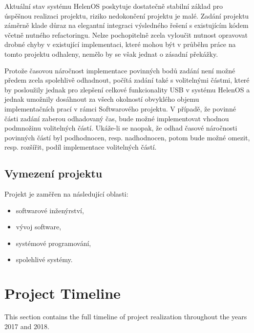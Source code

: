 Aktuální stav systému HelenOS poskytuje dostatečně stabilní základ pro úspěšnou realizaci
projektu, riziko nedokončení projektu je malé. Zadání projektu záměrně klade důraz na elegantní
integraci výsledného řešení s existujícím kódem včetně nutného refactoringu. Nelze pochopitelně
zcela vyloučit nutnost opravovat drobné chyby v existující implementaci, které mohou být
v průběhu práce na tomto projektu odhaleny, nemělo by se však jednat o zásadní překážky.

Protože časovou náročnost implementace povinných bodů zadání není možné předem zcela
spolehlivě odhadnout, počítá zadání také s volitelnými částmi, které by posloužily jednak pro
zlepšení celkové funkcionality USB v systému HelenOS a jednak umožnily dosáhnout za všech
okolností obvyklého objemu implementačních prací v rámci Softwarového projektu. V případě, že
povinné části zadání zaberou odhadovaný čas, bude možné implementovat vhodnou podmnožinu
volitelných částí. Ukáže-li se naopak, že odhad časové náročnosti povinných částí byl
podhodnocen, resp. nadhodnocen, potom bude možné omezit, resp. rozšířit, podíl implementace
volitelných částí.


\subsection{Vymezení projektu}

Projekt je zaměřen na následující oblasti:
%
\begin{itemize}
	\item softwarové inženýrství,
	\item vývoj software,
	\item systémové programování,
	\item spolehlivé systémy.
\end{itemize}


\section{Project Timeline}

This section contains the full timeline of project realization throughout the
years 2017 and 2018.

